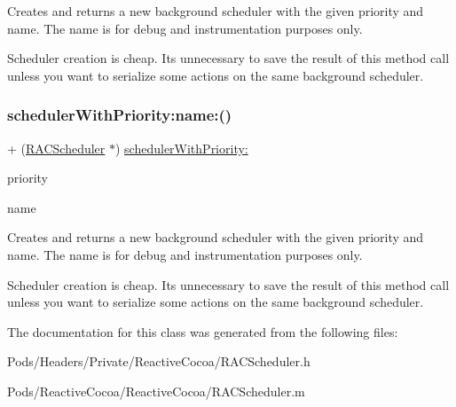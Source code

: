 Creates and returns a new background scheduler with the given priority and name. The name is for debug and instrumentation purposes only.

Scheduler creation is cheap. It\textquotesingle{}s unnecessary to save the result of this method call unless you want to serialize some actions on the same background scheduler. \mbox{\label{interface_r_a_c_scheduler_a28259d5d6caccd1c459f85154d9aca9a}} 
\subsubsection{\texorpdfstring{scheduler\+With\+Priority\+:name\+:()}{schedulerWithPriority:name:()}\hspace{0.1cm}{\footnotesize\ttfamily [3/3]}}
{\footnotesize\ttfamily + (\mbox{\hyperlink{interface_r_a_c_scheduler}{R\+A\+C\+Scheduler}} $\ast$) \mbox{\hyperlink{interface_r_a_c_scheduler_aa10e4f49fd6084c122ebd21e16e3de29}{scheduler\+With\+Priority\+:}} \begin{DoxyParamCaption}\item[{(R\+A\+C\+Scheduler\+Priority)}]{priority }\item[{name:(N\+S\+String $\ast$)}]{name }\end{DoxyParamCaption}}

Creates and returns a new background scheduler with the given priority and name. The name is for debug and instrumentation purposes only.

Scheduler creation is cheap. It\textquotesingle{}s unnecessary to save the result of this method call unless you want to serialize some actions on the same background scheduler. 

The documentation for this class was generated from the following files\+:\begin{DoxyCompactItemize}
\item 
Pods/\+Headers/\+Private/\+Reactive\+Cocoa/R\+A\+C\+Scheduler.\+h\item 
Pods/\+Reactive\+Cocoa/\+Reactive\+Cocoa/R\+A\+C\+Scheduler.\+m\end{DoxyCompactItemize}
